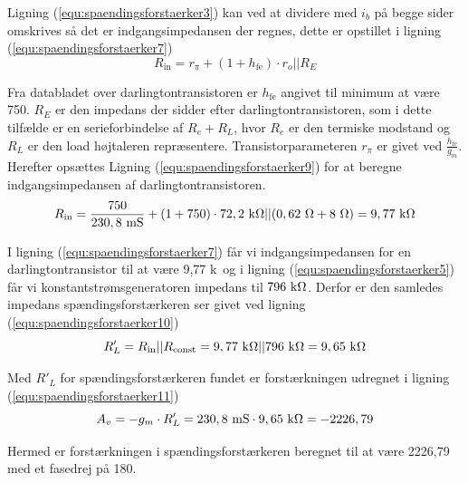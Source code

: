 Ligning (\ref{equ:spaendingsforstaerker3}) kan ved at dividere med $i_b$ på begge sider omskrives så det er indgangsimpedansen der regnes, dette er opstillet i ligning (\ref{equ:spaendingsforstaerker7})
\begin{equation}
\label{equ:spaendingsforstaerker7}
R_{\mathrm{in}} = r_{\pi} + (1+h_{\mathrm{fe}}) \cdot r_o||R_E 
\end{equation}

Fra databladet over darlingtontransistoren er $h_{\mathrm{fe}}$ angivet til minimum at være 750.  $R_E$ er den impedans der sidder efter darlingtontransistoren, som i dette tilfælde er en serieforbindelse af $R_e + R_L$, hvor $R_e$ er den termiske modstand og $R_L$ er den load højtaleren repræsentere. Transistorparameteren $r_{\pi}$ er givet ved $\frac{h_{\mathrm{fe}}}{g_m}$. Herefter opsættes Ligning (\ref{equ:spaendingsforstaerker9}) for at beregne indgangsimpedansen af darlingtontransistoren.
\begin{equation}
\label{equ:spaendingsforstaerker9}
R_{\mathrm{in}} = \frac{750}{230,8~\mathrm{mS}} + ( 1 + 750 ) \cdot 72,2~\mathrm{k}\ohm || (0,62~\ohm + 8~\ohm) = 9,77~\mathrm{k}\ohm  
\end{equation}

I ligning (\ref{equ:spaendingsforstaerker7}) får vi indgangsimpedansen for en darlingtontransistor til at være 9,77 k\ohm~og i ligning (\ref{equ:spaendingsforstaerker5}) får vi konstantstrømsgeneratoren impedans til $796~\mathrm{k}\ohm$. Derfor er den samledes impedans spændingsforstærkeren ser givet ved ligning (\ref{equ:spaendingsforstaerker10})
\begin{equation}
\label{equ:spaendingsforstaerker10}
R'_L = R_{\mathrm{in}}||R_{\mathrm{const}} = 9,77~\mathrm{k}\ohm || 796~\mathrm{k}\ohm = 9,65~\mathrm{k}\ohm
\end{equation}  

Med $R'_L$ for spændingsforstærkeren fundet er forstærkningen udregnet i ligning (\ref{equ:spaendingsforstaerker11})
\begin{equation}
\label{equ:spaendingsforstaerker11}
A_v = -g_m \cdot R'_L = 230,8~\mathrm{mS} \cdot 9,65~\mathrm{k}\ohm = -2226,79
\end{equation}

Hermed er forstærkningen i spændingsforstærkeren beregnet til at være 2226,79 med et fasedrej på 180\degree .